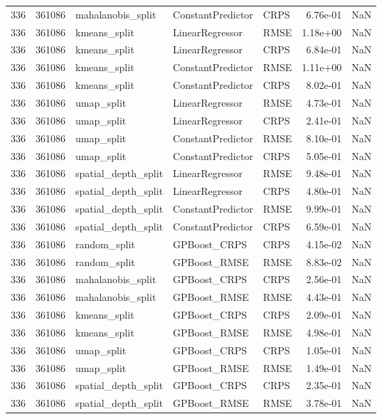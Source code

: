 \begin{tabular}{rrlllrr}
336 & 361086 & mahalanobis\_split & ConstantPredictor & CRPS & 6.76e-01 & NaN \\
336 & 361086 & kmeans\_split & LinearRegressor & RMSE & 1.18e+00 & NaN \\
336 & 361086 & kmeans\_split & LinearRegressor & CRPS & 6.84e-01 & NaN \\
336 & 361086 & kmeans\_split & ConstantPredictor & RMSE & 1.11e+00 & NaN \\
336 & 361086 & kmeans\_split & ConstantPredictor & CRPS & 8.02e-01 & NaN \\
336 & 361086 & umap\_split & LinearRegressor & RMSE & 4.73e-01 & NaN \\
336 & 361086 & umap\_split & LinearRegressor & CRPS & 2.41e-01 & NaN \\
336 & 361086 & umap\_split & ConstantPredictor & RMSE & 8.10e-01 & NaN \\
336 & 361086 & umap\_split & ConstantPredictor & CRPS & 5.05e-01 & NaN \\
336 & 361086 & spatial\_depth\_split & LinearRegressor & RMSE & 9.48e-01 & NaN \\
336 & 361086 & spatial\_depth\_split & LinearRegressor & CRPS & 4.80e-01 & NaN \\
336 & 361086 & spatial\_depth\_split & ConstantPredictor & RMSE & 9.99e-01 & NaN \\
336 & 361086 & spatial\_depth\_split & ConstantPredictor & CRPS & 6.59e-01 & NaN \\
336 & 361086 & random\_split & GPBoost\_CRPS & CRPS & 4.15e-02 & NaN \\
336 & 361086 & random\_split & GPBoost\_RMSE & RMSE & 8.83e-02 & NaN \\
336 & 361086 & mahalanobis\_split & GPBoost\_CRPS & CRPS & 2.56e-01 & NaN \\
336 & 361086 & mahalanobis\_split & GPBoost\_RMSE & RMSE & 4.43e-01 & NaN \\
336 & 361086 & kmeans\_split & GPBoost\_CRPS & CRPS & 2.09e-01 & NaN \\
336 & 361086 & kmeans\_split & GPBoost\_RMSE & RMSE & 4.98e-01 & NaN \\
336 & 361086 & umap\_split & GPBoost\_CRPS & CRPS & 1.05e-01 & NaN \\
336 & 361086 & umap\_split & GPBoost\_RMSE & RMSE & 1.49e-01 & NaN \\
336 & 361086 & spatial\_depth\_split & GPBoost\_CRPS & CRPS & 2.35e-01 & NaN \\
336 & 361086 & spatial\_depth\_split & GPBoost\_RMSE & RMSE & 3.78e-01 & NaN \\

\end{tabular}
